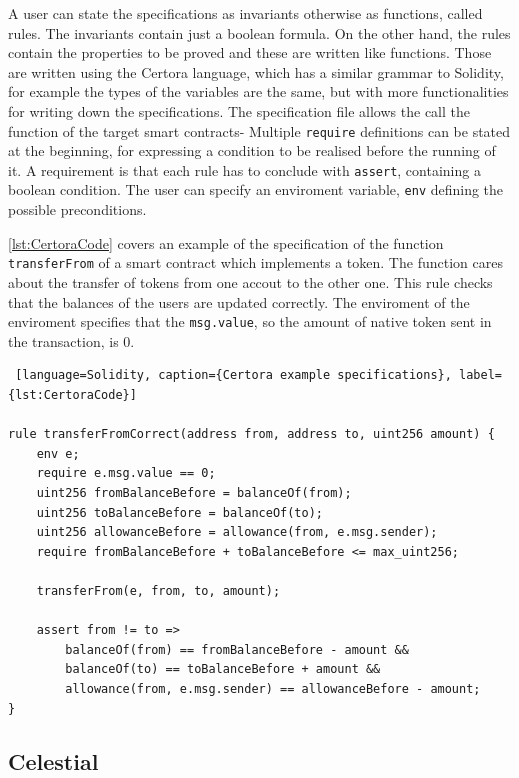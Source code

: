 A user can state the specifications as invariants otherwise as functions, called rules.
The invariants contain just a boolean formula.
On the other hand, the rules contain the properties to be proved and these are written like functions. 
Those are written using the Certora language, which has a similar grammar to Solidity, for example the types of the variables are the same, but with more functionalities for writing down the specifications. 
The specification file allows the call the function of the target smart contracts-
Multiple \texttt{require} definitions can be stated at the beginning, for expressing a condition to be realised before the running of it.  
A requirement is that each rule has to conclude with \texttt{assert}, containing a boolean condition. 
The user can specify an enviroment variable, \texttt{env} defining the possible preconditions.

\autoref{lst:CertoraCode} covers an example of the specification of the function \texttt{transferFrom} of a smart contract which implements a token. 
The function cares about the transfer of tokens from one accout to the other one. This rule checks that the balances of the users are updated correctly. 
The enviroment of the enviroment specifies that the \texttt{msg.value}, so the amount of native token sent in the transaction, is 0.
\begin{lstlisting} [language=Solidity, caption={Certora example specifications}, label={lst:CertoraCode}]

rule transferFromCorrect(address from, address to, uint256 amount) {
    env e;
    require e.msg.value == 0;
    uint256 fromBalanceBefore = balanceOf(from);
    uint256 toBalanceBefore = balanceOf(to);
    uint256 allowanceBefore = allowance(from, e.msg.sender);
    require fromBalanceBefore + toBalanceBefore <= max_uint256;

    transferFrom(e, from, to, amount);

    assert from != to =>
        balanceOf(from) == fromBalanceBefore - amount &&
        balanceOf(to) == toBalanceBefore + amount &&
        allowance(from, e.msg.sender) == allowanceBefore - amount;
}

\end{lstlisting}



\subsection{Celestial}

